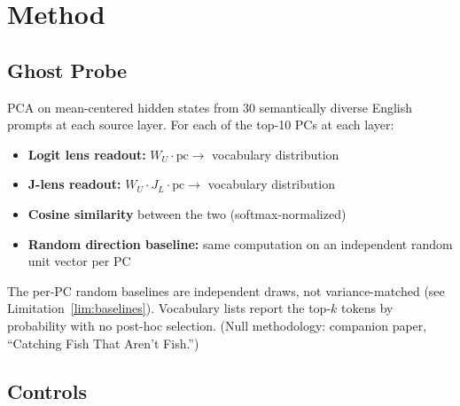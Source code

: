 \documentclass[11pt,a4paper]{article}
\begin{document}
\section{Method}

\subsection{Ghost Probe}

PCA on mean-centered hidden states from 30 semantically diverse English prompts at each source layer. For each of the top-10 PCs at each layer:

\begin{itemize}
  \item \textbf{Logit lens readout:} $W_U \cdot \text{pc} \rightarrow$ vocabulary distribution
  \item \textbf{J-lens readout:} $W_U \cdot J_L \cdot \text{pc} \rightarrow$ vocabulary distribution
  \item \textbf{Cosine similarity} between the two (softmax-normalized)
  \item \textbf{Random direction baseline:} same computation on an independent random unit vector per PC
\end{itemize}

The per-PC random baselines are independent draws, not variance-matched (see Limitation~\ref{lim:baselines}). Vocabulary lists report the top-$k$ tokens by probability with no post-hoc selection. (Null methodology: companion paper, ``Catching Fish That Aren't Fish.'')

\subsection{Controls}
\end{document}
